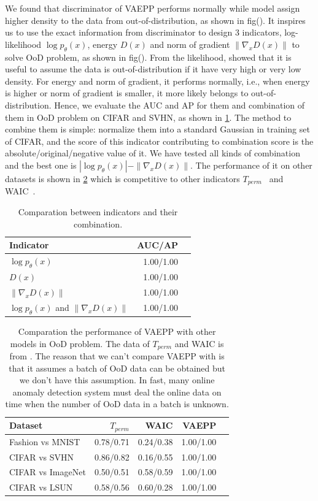 We found that discriminator of VAEPP performs normally while model assign higher density to the data from out-of-distribution, as shown in fig(). It inspires us to use the exact information from discriminator to design 3 indicators, log-likelihood $\log p_\theta(x)$, energy $D(x)$ and norm of gradient $\|\nabla_{x} D(x)\|$ to solve OoD problem, as shown in fig(). From the likelihood, \cite{song2017pixeldefend} showed that it is useful to assume the data is out-of-distribution if it have very high or very low density. For energy and norm of gradient, it performs normally, i.e., when energy is higher or norm of gradient is smaller, it more likely belongs to out-of-distribution. Hence, we evaluate the AUC and AP for them and combination of them in OoD problem on CIFAR and SVHN, as shown in \cref{tab:compare_ood}. The method to combine them is simple: normalize them into a standard Gaussian in training set of CIFAR, and the score of this indicator contributing to combination score is the absolute/original/negative value of it. We have tested all kinds of combination and the best one is $|\log p_\theta(x)| - \|\nabla_x D(x)\|$. The performance of it on other datasets is shown in \cref{tab:compare_ood_other_datasets} which is competitive to other indicators $T_{perm}$~\cite{song2017pixeldefend} and WAIC~\cite{choi2018waic}. 
\begin{table}[tb]
\centering
\begin{tabular}{lrr}  
\toprule
Indicator  & AUC/AP \\
\midrule
$\log p_\theta(x)$   &  1.00/1.00      \\
$D(x)$               &  1.00/1.00      \\
$\|\nabla_x D(x)\|$  &  1.00/1.00      \\
$\log p_\theta(x)$ and $\|\nabla_x D(x)\|$ & 1.00/1.00 \\
\bottomrule
\end{tabular}
\caption{Comparation between indicators and their combination.}
\label{tab:compare_ood}
\end{table}
\begin{table}[tb]
\centering
\begin{tabular}{lrrrr}  
\toprule
Dataset  &  $T_{perm}$ & WAIC & VAEPP\\
\midrule
Fashion vs MNIST  & 0.78/0.71  & 0.24/0.38 & 1.00/1.00  \\
CIFAR vs SVHN     & 0.86/0.82  & 0.16/0.55 & 1.00/1.00  \\
CIFAR vs ImageNet & 0.50/0.51  & 0.58/0.59 & 1.00/1.00  \\
CIFAR vs LSUN     & 0.58/0.56  & 0.60/0.28 & 1.00/1.00  \\
\bottomrule
\end{tabular}
\caption{Comparation the performance of VAEPP with other models in OoD problem. The data of $T_{perm}$ and WAIC is from \protect \cite{song2019unsupervised}. The reason that we can't compare VAEPP with \protect\cite{song2019unsupervised} is that it assumes a batch of OoD data can be obtained but we don't have this assumption. In fast, many online anomaly detection system must deal the online data on time when the number of OoD data in a batch is unknown. }
\label{tab:compare_ood_other_datasets}
\end{table}

